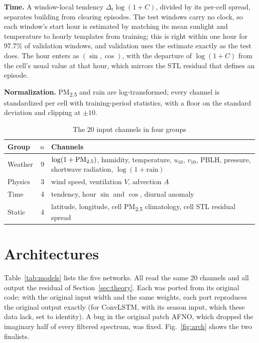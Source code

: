 \documentclass[conference]{IEEEtran}
\newcommand{\PM}{PM\textsubscript{2.5}}
\begin{document}
\textbf{Time.} A window-local tendency $\Delta_t\log(1+C)$, divided by its per-cell spread, separates building from clearing episodes. The test windows carry no clock, so each window's start hour is estimated by matching its mean sunlight and temperature to hourly templates from training; this is right within one hour for 97.7\% of validation windows, and validation uses the estimate exactly as the test does. The hour enters as $(\sin,\cos)$, with the departure of $\log(1+C)$ from the cell's usual value at that hour, which mirrors the STL residual that defines an episode.

\textbf{Normalization.} \PM{} and rain are log-transformed; every channel is standardized per cell with training-period statistics, with a floor on the standard deviation and clipping at $\pm10$.

\begin{table}[!t]
\centering
\caption{The 20 input channels in four groups}
\label{tab:features}
\begin{tabular}{@{}lrp{}@{}}
\toprule
Group & $n$ & Channels \\
\midrule
Weather & 9 & $\log(1+\text{\PM})$, humidity, temperature, $u_{10}$, $v_{10}$, PBLH, pressure, shortwave radiation, $\log(1+\text{rain})$ \\
Physics & 3 & wind speed, ventilation $V$, advection $A$ \\
Time & 4 & tendency, hour $\sin$ and $\cos$, diurnal anomaly \\
Static & 4 & latitude, longitude, cell \PM{} climatology, cell STL residual spread \\
\bottomrule
\end{tabular}
\end{table}

\section{Architectures}
\label{sec:arch}
Table~\ref{tab:models} lists the five networks. All read the same 20 channels and all output the residual of Section~\ref{sec:theory}. Each was ported from its original code; with the original input width and the same weights, each port reproduces the original output exactly (for ConvLSTM, with its season input, which these data lack, set to identity). A bug in the original patch AFNO, which dropped the imaginary half of every filtered spectrum, was fixed. Fig.~\ref{fig:arch} shows the two finalists.
\end{document}
